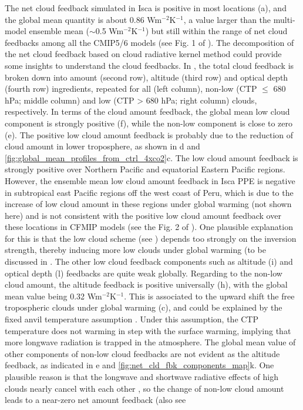 The net cloud feedback simulated in Isca is positive in most locations (a), and the global mean quantity is about 0.86 Wm$^{-2}$K$^{-1}$, a value larger than the multi-model ensemble mean ($\sim$0.5 Wm$^{-2}$K$^{-1}$) but still within the range of net cloud feedbacks among all the CMIP5/6 models (see Fig. 1 of \citealt{Zelinka2020causes}). The decomposition of the net cloud feedback based on cloud radiative kernel method could provide some insights to understand the cloud feedbacks. In , the total cloud feedback is broken down into amount (second row), altitude (third row) and optical depth (fourth row) ingredients, repeated for all (left column), non-low (CTP $\le$ 680 hPa; middle column) and low (CTP > 680 hPa; right column) clouds, respectively. In terms of the cloud amount feedback, the global mean low cloud component is strongly positive (f), while the non-low component is close to zero (e). The positive low cloud amount feedback is probably due to the reduction of cloud amount in lower troposphere, as shown in d and  \ref{fig:global_mean_profiles_from_ctrl_4xco2}c. The low cloud amount feedback is strongly positive over Northern Pacific and equatorial Eastern Pacific regions. However, the ensemble mean low cloud amount feedback in Isca PPE is negative in subtropical east Pacific regions off the west coast of Peru, which is due to the increase of low cloud amount in these regions under global warming (not shown here) and is not consistent with the positive low cloud amount feedback over these locations in CFMIP models (see the Fig. 2 of \citealt{Zelinka2016insights}). One plausible explanation for this is that the low cloud scheme (see ) depends too strongly on the inversion strength, thereby inducing more low clouds under global warming (to be discussed in . The other low cloud feedback components such as altitude (i) and optical depth (l) feedbacks are quite weak globally. Regarding to the non-low cloud amount, the altitude feedback is positive universally (h), with the global mean value being 0.32 Wm$^{-2}$K$^{-1}$. This is associated to the upward shift the free tropospheric clouds under global warming (c), and could be explained by the fixed anvil temperature assumption \citep[e.g.,][]{Hartmann2002FAT, Ceppi2017}. Under this assumption, the CTP temperature does not warming in step with the surface warming, implying that more longwave radiation is trapped in the atmosphere. The global mean value of other components of non-low cloud feedbacks are not evident as the altitude feedback, as indicated in e and \ref{fig:net_cld_fbk_components_map}k. One plausible reason is that the longwave and shortwave radiative effects of high clouds nearly cancel with each other \citep{Kiehl1994observed}, so the change of non-low cloud amount leads to a near-zero net amount feedback (also see 